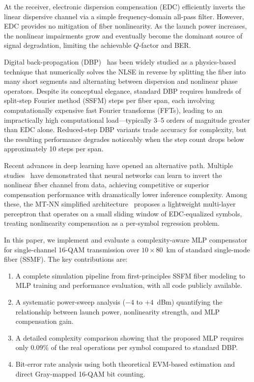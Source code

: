 \documentclass[conference]{IEEEtran}
\begin{document}
At the receiver, electronic dispersion compensation (EDC) efficiently inverts the linear dispersive channel via a simple frequency-domain all-pass filter. However, EDC provides no mitigation of fiber nonlinearity. As the launch power increases, the nonlinear impairments grow and eventually become the dominant source of signal degradation, limiting the achievable $Q$-factor and BER.

Digital back-propagation (DBP)~\cite{ip2008} has been widely studied as a physics-based technique that numerically solves the NLSE in reverse by splitting the fiber into many short segments and alternating between dispersion and nonlinear phase operators. Despite its conceptual elegance, standard DBP requires hundreds of split-step Fourier method (SSFM) steps per fiber span, each involving computationally expensive fast Fourier transforms (FFTs), leading to an impractically high computational load---typically 3--5 orders of magnitude greater than EDC alone. Reduced-step DBP variants trade accuracy for complexity, but the resulting performance degrades noticeably when the step count drops below approximately 10 steps per span.

Recent advances in deep learning have opened an alternative path. Multiple studies~\cite{gdpkan2025,operator2025,mtnn2025} have demonstrated that neural networks can learn to invert the nonlinear fiber channel from data, achieving competitive or superior compensation performance with dramatically lower inference complexity. Among these, the MT-NN simplified architecture~\cite{mtnn2025} proposes a lightweight multi-layer perceptron that operates on a small sliding window of EDC-equalized symbols, treating nonlinearity compensation as a per-symbol regression problem.

In this paper, we implement and evaluate a complexity-aware MLP compensator for single-channel 16-QAM transmission over $10 \times 80$~km of standard single-mode fiber (SSMF). The key contributions are:

\begin{enumerate}
    \item A complete simulation pipeline from first-principles SSFM fiber modeling to MLP training and performance evaluation, with all code publicly available.
    \item A systematic power-sweep analysis ($-4$ to $+4$~dBm) quantifying the relationship between launch power, nonlinearity strength, and MLP compensation gain.
    \item A detailed complexity comparison showing that the proposed MLP requires only 0.09\% of the real operations per symbol compared to standard DBP.
    \item Bit-error rate analysis using both theoretical EVM-based estimation and direct Gray-mapped 16-QAM bit counting.
\end{enumerate}
\end{document}

